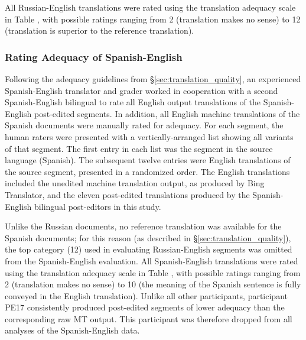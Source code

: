 All Russian-English translations were rated using the translation adequacy scale in Table , with possible ratings ranging from 2 (translation makes no sense) to 12 (translation is superior to the reference translation).




\subsubsection{Rating Adequacy of Spanish-English}

Following the adequacy guidelines from \S\ref{sec:translation_quality}, 
%
an experienced Spanish-English translator and grader worked in cooperation with a second Spanish-English bilingual to rate all English output translations of the Spanish-English post-edited segments.
%
In addition, all English machine translations of the Spanish documents were manually rated for adequacy.
%
For each segment, the human raters were presented with a vertically-arranged list showing all variants of that segment.
%
The first entry in each list was the segment in the source language (Spanish).
%
The subsequent twelve entries were English translations of the source segment, presented in a randomized order.
%
The English translations included the unedited machine translation output, as produced by Bing Translator,
%
and the eleven post-edited translations produced by the Spanish-English bilingual post-editors in this study.

Unlike the Russian documents, no reference translation was available for the Spanish documents; for this reason (as described in \S\ref{sec:translation_quality}), the top category (12) used in evaluating Russian-English segments was omitted from the Spanish-English evaluation.
%
All Spanish-English translations were rated using the translation adequacy scale in Table , with possible ratings ranging from 2 (translation makes no sense) to 10 (the meaning of the Spanish sentence is fully conveyed in the English translation).
%
Unlike all other participants, participant PE17 consistently produced post-edited segments of lower adequacy than the corresponding raw MT output. This participant was therefore dropped from all analyses of the Spanish-English data.

